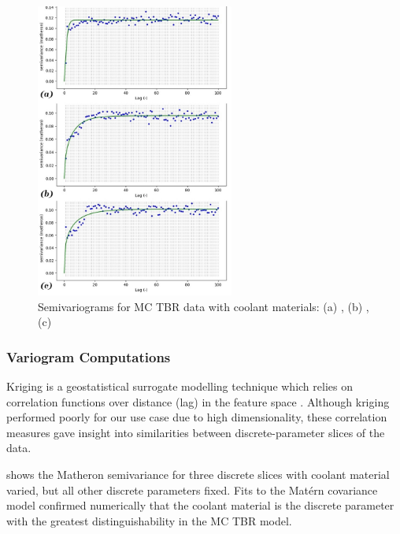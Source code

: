\begin{figure}
  \vspace{-30pt}
  \begin{center}
    \hspace*{-.3\columnsep}\includegraphics[width=0.58\textwidth]{fig3_allvar.jpg}
	\caption{Semivariograms for MC TBR data with coolant materials: (a) ,
	(b) , (c) }
    \label{fig:var}
  \end{center}
  \vspace{-50pt}
\end{figure}

\subsubsection{Variogram Computations}


Kriging is a geostatistical surrogate modelling technique which relies on
correlation functions over distance (lag) in the feature space \cite{Bouhlel2018}. Although kriging performed poorly for our use case due to high dimensionality, these correlation measures gave insight into similarities between discrete-parameter slices of the data.

 shows the Matheron semivariance \cite{Matheron1963} for three discrete slices with coolant material varied, but all other discrete parameters fixed. Fits \cite{KrigingFig} to the Matérn covariance model confirmed numerically that the coolant material is the discrete parameter with the greatest distinguishability in the MC TBR model. 


